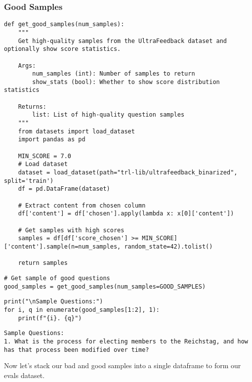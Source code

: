 \subsubsection{Good Samples}

\begin{verbatim}
def get_good_samples(num_samples):
    """
    Get high-quality samples from the UltraFeedback dataset and optionally show score statistics.
    
    Args:
        num_samples (int): Number of samples to return
        show_stats (bool): Whether to show score distribution statistics
        
    Returns:
        list: List of high-quality question samples
    """
    from datasets import load_dataset
    import pandas as pd
    
    MIN_SCORE = 7.0
    # Load dataset
    dataset = load_dataset(path="trl-lib/ultrafeedback_binarized", split='train')
    df = pd.DataFrame(dataset)
    
    # Extract content from chosen column
    df['content'] = df['chosen'].apply(lambda x: x[0]['content'])
    
    # Get samples with high scores
    samples = df[df['score_chosen'] >= MIN_SCORE]['content'].sample(n=num_samples, random_state=42).tolist()
            
    return samples
\end{verbatim}

\begin{verbatim}
# Get sample of good questions
good_samples = get_good_samples(num_samples=GOOD_SAMPLES)
\end{verbatim}

\begin{verbatim}
print("\nSample Questions:")
for i, q in enumerate(good_samples[1:2], 1):
    print(f"{i}. {q}")
\end{verbatim}

\begin{verbatim}
Sample Questions:
1. What is the process for electing members to the Reichstag, and how has that process been modified over time?
\end{verbatim}

Now let's stack our bad and good samples into a single dataframe to form our evals dataset.

